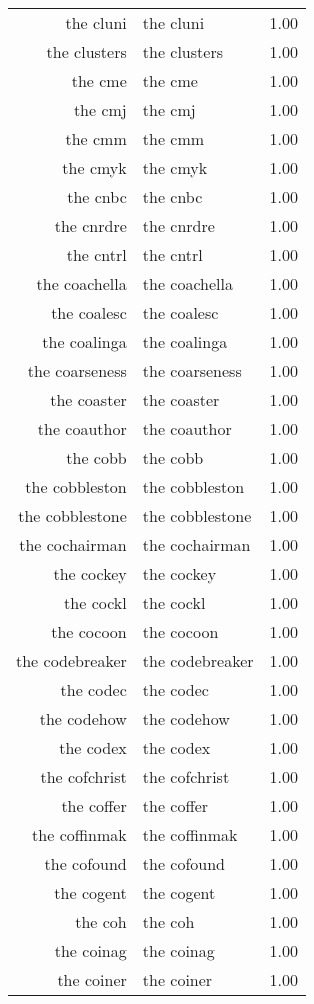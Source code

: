 \begin{table}[ht]
\begin{tabular}{rlr}
  the cluni & the cluni & 1.00 \\ 
  the clusters & the clusters & 1.00 \\ 
  the cme & the cme & 1.00 \\ 
  the cmj & the cmj & 1.00 \\ 
  the cmm & the cmm & 1.00 \\ 
  the cmyk & the cmyk & 1.00 \\ 
  the cnbc & the cnbc & 1.00 \\ 
  the cnrdre & the cnrdre & 1.00 \\ 
  the cntrl & the cntrl & 1.00 \\ 
  the coachella & the coachella & 1.00 \\ 
  the coalesc & the coalesc & 1.00 \\ 
  the coalinga & the coalinga & 1.00 \\ 
  the coarseness & the coarseness & 1.00 \\ 
  the coaster & the coaster & 1.00 \\ 
  the coauthor & the coauthor & 1.00 \\ 
  the cobb & the cobb & 1.00 \\ 
  the cobbleston & the cobbleston & 1.00 \\ 
  the cobblestone & the cobblestone & 1.00 \\ 
  the cochairman & the cochairman & 1.00 \\ 
  the cockey & the cockey & 1.00 \\ 
  the cockl & the cockl & 1.00 \\ 
  the cocoon & the cocoon & 1.00 \\ 
  the codebreaker & the codebreaker & 1.00 \\ 
  the codec & the codec & 1.00 \\ 
  the codehow & the codehow & 1.00 \\ 
  the codex & the codex & 1.00 \\ 
  the cofchrist & the cofchrist & 1.00 \\ 
  the coffer & the coffer & 1.00 \\ 
  the coffinmak & the coffinmak & 1.00 \\ 
  the cofound & the cofound & 1.00 \\ 
  the cogent & the cogent & 1.00 \\ 
  the coh & the coh & 1.00 \\ 
  the coinag & the coinag & 1.00 \\ 
  the coiner & the coiner & 1.00 \\ 

\end{tabular}
\end{table}
